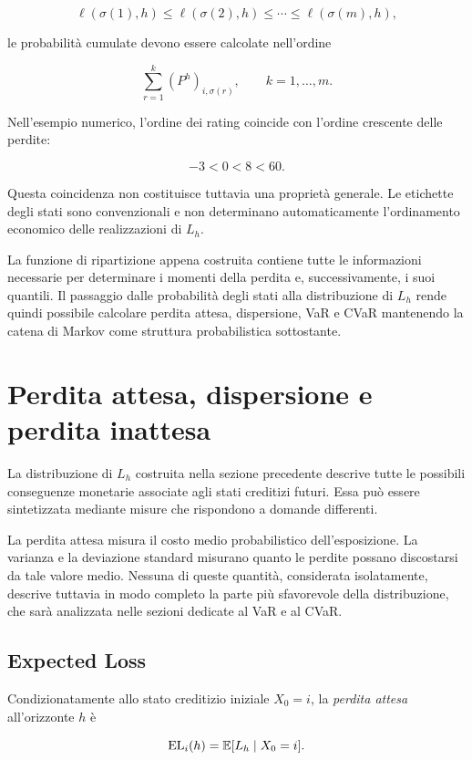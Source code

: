 \[
\ell(\sigma(1),h)
\leq
\ell(\sigma(2),h)
\leq
\cdots
\leq
\ell(\sigma(m),h),
\]

le probabilit\`{a} cumulate devono essere calcolate nell'ordine

\[
\sum_{r=1}^{k}
(P^h)_{i,\sigma(r)},
\qquad
k=1,\ldots,m.
\]

Nell'esempio numerico, l'ordine dei rating coincide con l'ordine
crescente delle perdite:

\[
-3<0<8<60.
\]

Questa coincidenza non costituisce tuttavia una propriet\`{a}
generale. Le etichette degli stati sono convenzionali e non
determinano automaticamente l'ordinamento economico delle
realizzazioni di $L_h$.

La funzione di ripartizione appena costruita contiene tutte le
informazioni necessarie per determinare i momenti della perdita e,
successivamente, i suoi quantili. Il passaggio dalle probabilit\`{a}
degli stati alla distribuzione di $L_h$ rende quindi possibile
calcolare perdita attesa, dispersione, VaR e CVaR mantenendo la catena
di Markov come struttura probabilistica sottostante.

\section{Perdita attesa, dispersione e perdita inattesa}

\label{sec:cap9-perdita-attesa-dispersione}

La distribuzione di $L_h$ costruita nella sezione precedente descrive
tutte le possibili conseguenze monetarie associate agli stati creditizi
futuri. Essa pu\`{o} essere sintetizzata mediante misure che rispondono
a domande differenti.

La perdita attesa misura il costo medio probabilistico dell'esposizione.
La varianza e la deviazione standard misurano quanto le perdite possano
discostarsi da tale valore medio. Nessuna di queste quantit\`{a},
considerata isolatamente, descrive tuttavia in modo completo la parte
pi\`{u} sfavorevole della distribuzione, che sar\`{a} analizzata nelle
sezioni dedicate al VaR e al CVaR.

\subsection{Expected Loss}

\label{subsec:cap9-expected-loss}

\begin{definition}
Condizionatamente allo stato creditizio iniziale $X_0=i$, la
\emph{perdita attesa} all'orizzonte $h$ \`{e}

\[
\mathrm{EL}_i(h)
=
\mathbb{E}[L_h\mid X_0=i].
\]
\end{definition}

